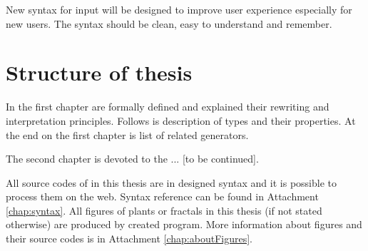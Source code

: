 New syntax for input will be designed to improve user experience especially for new users.
The syntax should be clean, easy to understand and remember.


\section*{Structure of thesis}

In the first chapter \lsystems are formally defined and explained their rewriting and interpretation principles.
Follows is description of \lsystem types and their properties.
At the end on the first chapter is list of related \lsystem generators.

The second chapter is devoted to the ... [to be continued].

All source codes of \lsystems in this thesis are in designed syntax and it is possible to process them on the web.
Syntax reference can be found in Attachment \ref{chap:syntax}.
All figures of plants or fractals in this thesis (if not stated otherwise) are produced by created program.
More information about figures and their source codes is in Attachment \ref{chap:aboutFigures}.































